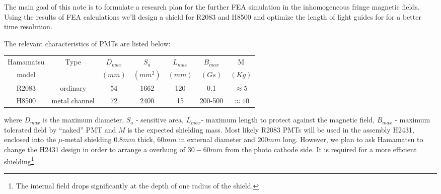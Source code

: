 \documentclass[12pt]{article}
\begin{document}

The main goal of this note is to formulate a research plan  
for  the further   FEA  simulation  in the  inhomogeneous fringe  magnetic fields.
Using  the  results of FEA  calculations we'll  design a shield for R2083 and H8500
and 
optimize  the length of light guides for  for a  better time resolution.

The relevant characteristics of PMTs are listed below:
\begin{center}
\begin{tabular}{|c|c|c|c|c|c|c|}  \hline 
Hamamatsu& Type         &$D_{max}$& $S_a$    &  $L_{max}$  &  $B_{max}$& M        \\
model    &              & $(mm)$  & $(mm^2)$ & $(mm)$ &    $(Gs)$ &   $(Kg)$    \\ \hline
R2083    & ordinary     & 54      & 1662     & 120    &    0.1    & $\approx 5$    \\
H8500    & metal channel& 72      & 2400     & 15     &   200-500 & $\approx10$    \\ \hline
\end{tabular}
\end{center}
where $D_{max}$ is the maximum diameter, $S_a$ - sensitive area,
 $L_{max}$- maximum length to protect against the magnetic field,
$B_{max}$ - maximum tolerated field by ``naked'' PMT and $M$ is the expected 
shielding mass.
\bigskip
Most likely  R2083 PMTs will be used in the assembly H2431, enclosed into 
the $\mu$-metal shielding $0.8mm$ thick, $60mm$ in external diameter and $200mm$ long.
However, we plan to ask Hamamatsu to change the  H2431 design  in order to arrange a 
overhung of $30-60mm$ from  the photo cathode side.  It is required for a 
 more efficient shielding\footnote{The internal field drops significantly at the depth of one radius of the shield.}.
\end{document}
